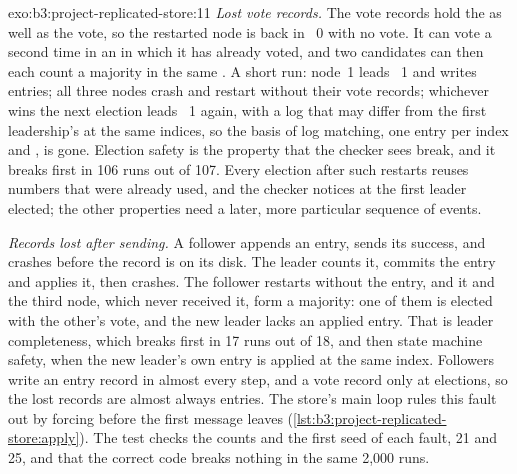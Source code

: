 \begin{solution}{exo:b3:project-replicated-store:11}
\emph{Lost vote records.} The vote records hold the  as well as the vote, so the restarted node is back in ~0 with no vote. It can vote a second time in an  in which it has already voted, and two candidates can then each count a majority in the same . A short run: node~1 leads ~1 and writes entries; all three nodes crash and restart without their vote records; whichever wins the next election leads ~1 again, with a log that may differ from the first leadership's at the same indices, so the basis of log matching, one entry per index and , is gone. Election safety is the property that the checker sees break, and it breaks first in 106 runs out of 107. Every election after such restarts reuses  numbers that were already used, and the checker notices at the first leader elected; the other properties need a later, more particular sequence of events.

\emph{Records lost after sending.} A follower appends an entry, sends its success, and crashes before the record is on its disk. The leader counts it, commits the entry and applies it, then crashes. The follower restarts without the entry, and it and the third node, which never received it, form a majority: one of them is elected with the other's vote, and the new leader lacks an applied entry. That is leader completeness, which breaks first in 17 runs out of 18, and then state machine safety, when the new leader's own entry is applied at the same index. Followers write an entry record in almost every step, and a vote record only at elections, so the lost records are almost always entries. The store's main loop rules this fault out by forcing  before the first message leaves (\cref{lst:b3:project-replicated-store:apply}). The test  checks the counts and the first seed of each fault, 21 and 25, and that the correct code breaks nothing in the same 2,000 runs.
\end{solution}

